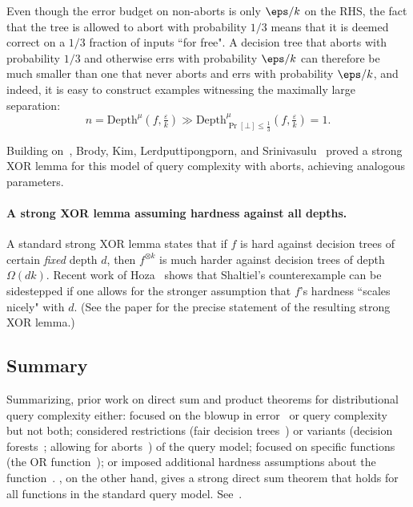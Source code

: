 \documentclass[11pt]{article}
\newcommand{\calnote}[1]{\footnote{{\bf \color{cyan}Caleb}: {#1}}}
\newcommand{\gnote}[1]{\footnote{{\bf \color{violet}Guy}: {#1}}}
\begin{document}
Even though the error budget on non-aborts is only $\eps/k$ on the RHS, the fact that the tree is allowed to abort with probability $1/3$ means that it is deemed correct on a $1/3$ fraction of inputs ``for free". A decision tree that aborts with probability $1/3$ and otherwise errs with probability $\eps/k$ can therefore be much smaller than one that never aborts and errs with probability $\eps/k$, and indeed, it is easy to construct examples witnessing the maximally large separation: 
\[ 
n = \mathrm{Depth}^{\mu}(f,\tfrac{\varepsilon}{k})  \gg \mathrm{Depth}^{\mu}_{\Pr[\bot]\le\frac1{3}}(f,\tfrac{\varepsilon}{k}) = 1.
\] 



Building on~\cite{BB19}, Brody, Kim, Lerdputtipongporn, and Srinivasulu~\cite{BKLS23} proved a strong XOR lemma for this model of query complexity with aborts, achieving analogous parameters.  

\paragraph{A strong XOR lemma assuming hardness against all depths.}
A standard strong XOR lemma states that if $f$ is hard against decision trees of certain {\sl fixed} depth $d$, then $f^{\otimes k}$ is much harder against decision trees of depth $\Omega(dk)$. Recent work of Hoza~\cite{Hoza23} shows that Shaltiel's counterexample can be sidestepped if one allows for the stronger assumption that $f$'s hardness ``scales nicely" with $d$. (See the paper for the precise statement of the resulting strong XOR lemma.) 


\subsection{Summary}

Summarizing, prior work on direct sum and product theorems for distributional query complexity either: focused on the blowup in error~\cite{IRW94} or query complexity~\cite{JKS10, BDK18}  but not both; considered restrictions (fair decision trees~\cite{Sha04}) or variants (decision forests~\cite{NRS94}; allowing for aborts~\cite{BB19, BKLS23}) of the query model; focused on specific functions (the OR function~\cite{KSdW07}); or imposed additional hardness assumptions about the function~\cite{Hoza23}. , on the other hand, gives a strong direct sum theorem that holds for all functions in the standard query model. See~. %
\medskip 
\end{document}
